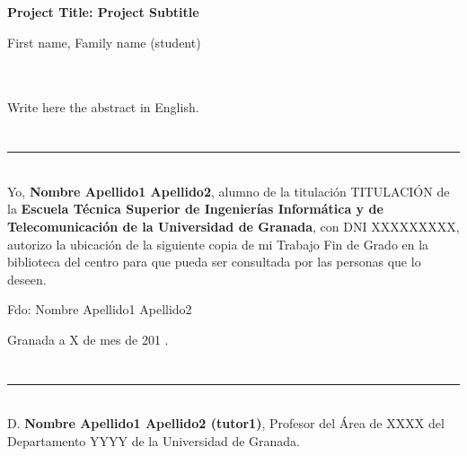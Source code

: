 \cleardoublepage


\thispagestyle{empty}


\begin{center}
{\large\bfseries Project Title: Project Subtitle}\\
\end{center}
\begin{center}
First name, Family name (student)\\
\end{center}

\\

\vspace{0.7cm}
\\

Write here the abstract in English.

\chapter*{}
\thispagestyle{empty}

\noindent\rule[-1ex]{\textwidth}{2pt}\\[4.5ex]

Yo, \textbf{Nombre Apellido1 Apellido2}, alumno de la titulación TITULACIÓN de la \textbf{Escuela Técnica Superior
de Ingenierías Informática y de Telecomunicación de la Universidad de Granada}, con DNI XXXXXXXXX, autorizo la
ubicación de la siguiente copia de mi Trabajo Fin de Grado en la biblioteca del centro para que pueda ser
consultada por las personas que lo deseen.

\vspace{6cm}

\noindent Fdo: Nombre Apellido1 Apellido2

\vspace{2cm}

\begin{flushright}
Granada a X de mes de 201 .
\end{flushright}


\chapter*{}
\thispagestyle{empty}

\noindent\rule[-1ex]{\textwidth}{2pt}\\[4.5ex]

D. \textbf{Nombre Apellido1 Apellido2 (tutor1)}, Profesor del Área de XXXX del Departamento YYYY de la Universidad de Granada.

